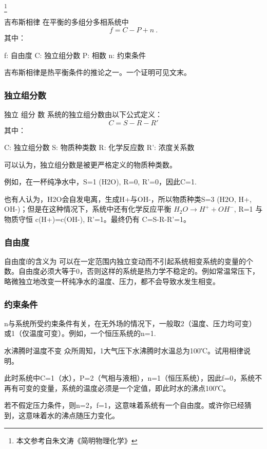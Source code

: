 
\footnote{本文参考自朱文涛《简明物理化学》}

\begin{theorem}{吉布斯相律}
在平衡的多组分多相系统中
\begin{equation}
f=C-P+n~.
\end{equation}
其中：

f: 自由度
C: 独立组分数
P: 相数
n: 约束条件
\end{theorem}
吉布斯相律是热平衡条件的推论之一。一个证明可见文末。

\subsubsection{独立组分数}
\begin{definition}{独立 组分 数}
系统的独立组分数由以下公式定义：
\begin{equation}
C=S-R-R'
\end{equation}
其中：

C: 独立组分数
S: 物质种类数
R: 化学反应数
R': 浓度关系数
\end{definition}

可以认为，独立组分数是被更严格定义的物质种类数。

例如，在一杯纯净水中，S=1 (H2O), R=0, R'=0，因此C=1.

也有人认为，H2O会自发电离，生成H+与OH-，所以物质种类S=3 (H2O, H+, OH-)；但是在这种情况下，系统中还有化学反应平衡 $H_2O\rightarrow H^++OH^-$, R=1 与物质守恒 c(H+)=c(OH-), R'=1。最终仍有 C=S-R-R'=1。

\subsubsection{自由度}
自由度f的含义为 可以在一定范围内独立变动而不引起系统相变系统的变量的个数。自由度必须大等于0，否则这样的系统是热力学不稳定的。例如常温常压下，略微独立地改变一杯纯净水的温度、压力，都不会导致水发生相变。

\subsubsection{约束条件}
n与系统所受约束条件有关，在无外场的情况下，一般取2（温度、压力均可变）或1（仅温度可变）。例如，一个恒压系统的n=1.

\begin{example}{水沸腾时温度不变}
众所周知，1大气压下水沸腾时水温总为100℃。试用相律说明。

此时系统中C=1（水），P=2（气相与液相），n=1（恒压系统），因此f=0，系统不再有可变的变量，系统的温度必须是一个定值，即此时水的沸点100℃。

若不假定压力条件，则n=2，f=1，这意味着系统有一个自由度。或许你已经猜到，这意味着水的沸点随压力变化。
\end{example}

